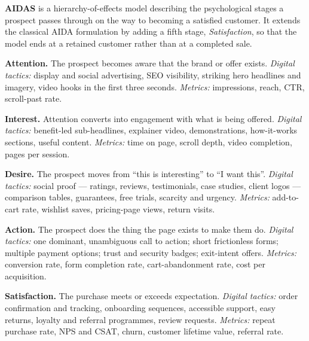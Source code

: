 \begin{qlist}

\textbf{AIDAS} is a hierarchy-of-effects model describing the psychological
stages a prospect passes through on the way to becoming a satisfied customer.
It extends the classical AIDA formulation by adding a fifth stage,
\emph{Satisfaction}, so that the model ends at a retained customer rather than
at a completed sale.

\begin{apts}
\item \textbf{Attention.} The prospect becomes aware that the brand or offer
      exists. \emph{Digital tactics:} display and social advertising, SEO
      visibility, striking hero headlines and imagery, video hooks in the first
      three seconds. \emph{Metrics:} impressions, reach, CTR, scroll-past rate.
\item \textbf{Interest.} Attention converts into engagement with what is being
      offered. \emph{Digital tactics:} benefit-led sub-headlines, explainer
      video, demonstrations, how-it-works sections, useful content.
      \emph{Metrics:} time on page, scroll depth, video completion, pages per
      session.
\item \textbf{Desire.} The prospect moves from ``this is interesting'' to ``I
      want this''. \emph{Digital tactics:} social proof --- ratings, reviews,
      testimonials, case studies, client logos --- comparison tables,
      guarantees, free trials, scarcity and urgency. \emph{Metrics:}
      add-to-cart rate, wishlist saves, pricing-page views, return visits.
\item \textbf{Action.} The prospect does the thing the page exists to make them
      do. \emph{Digital tactics:} one dominant, unambiguous call to action;
      short frictionless forms; multiple payment options; trust and security
      badges; exit-intent offers. \emph{Metrics:} conversion rate, form
      completion rate, cart-abandonment rate, cost per acquisition.
\item \textbf{Satisfaction.} The purchase meets or exceeds expectation.
      \emph{Digital tactics:} order confirmation and tracking, onboarding
      sequences, accessible support, easy returns, loyalty and referral
      programmes, review requests. \emph{Metrics:} repeat purchase rate, NPS
      and CSAT, churn, customer lifetime value, referral rate.
\end{apts}


\end{qlist}

